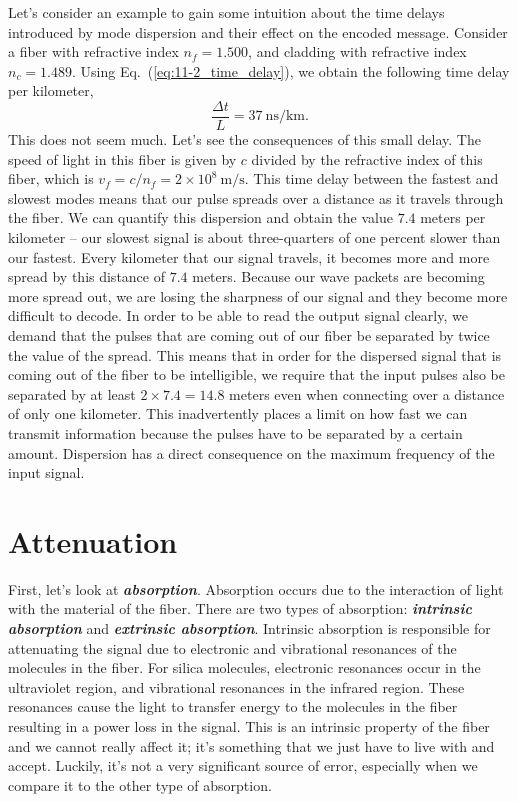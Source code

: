 Let's consider an example to gain some intuition about the time delays introduced by mode dispersion and their effect on the encoded message.
Consider a fiber with refractive index $n_f = 1.500$, and cladding with refractive index $n_c = 1.489$.
Using Eq.~(\ref{eq:11-2_time_delay}), we obtain the following time delay per kilometer,
\begin{equation}
    \frac{\Delta t}{L}=37 \mathrm{~ns} / \mathrm{km}.
\end{equation}
This does not seem much.
Let's see the consequences of this small delay.
The speed of light in this fiber is given by $c$ divided by the refractive index of this fiber, which is $v_f=c / n_f=2 \times 10^8 \mathrm{~m} / \mathrm{s}$.
This time delay between the fastest and slowest modes means that our pulse spreads over a distance as it travels through the fiber. We can quantify this dispersion and obtain the value $7.4$ meters per kilometer -- our slowest signal is about three-quarters of one percent slower than our fastest. Every kilometer that our signal travels, it becomes more and more spread by this distance of $7.4$ meters.
Because our wave packets are becoming more spread out, we are losing the sharpness of our signal and they become more difficult to decode.
In order to be able to read the output signal clearly, we demand that the pulses that are coming out of our fiber be separated by twice the value of the spread.
This means that in order for the dispersed signal that is coming out of the fiber to be intelligible, we require that the input pulses also be separated by at least $2\times 7.4 = 14.8$ meters even when connecting over a distance of only one kilometer.
This inadvertently places a limit on how fast we can transmit information because the pulses have to be separated by a certain amount.
Dispersion has a direct consequence on the maximum frequency of the input signal.




\section{Attenuation}
\label{sec:11-3_attenuation}

First, let's look at \textbf{\emph{absorption}}.
Absorption occurs due to the interaction of light with the material of the fiber.
There are two types of absorption: \textbf{\emph{intrinsic absorption}} and \textbf{\emph{extrinsic absorption}}.
Intrinsic absorption is responsible for attenuating the signal due to electronic and vibrational resonances of the molecules in the fiber.
For silica molecules, electronic resonances occur in the ultraviolet region, and vibrational resonances in the infrared region.
These resonances cause the light to transfer energy to the molecules in the fiber resulting in a power loss in the signal.
This is an intrinsic property of the fiber and we cannot really affect it; it's something that we just have to live with and accept.
Luckily, it's not a very significant source of error, especially when we compare it to the other type of absorption.

